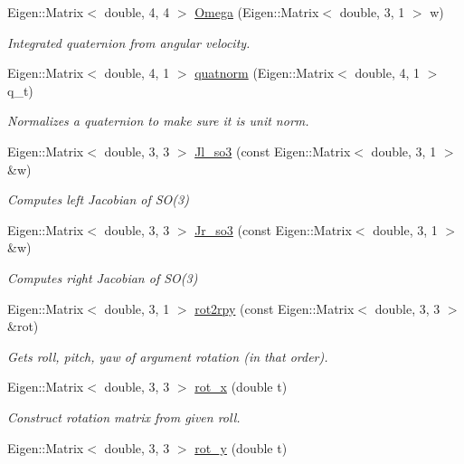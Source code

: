 \begin{DoxyCompactItemize}
Eigen\+::\+Matrix$<$ double, 4, 4 $>$ \hyperlink{namespaceov__core_a03115c09fd2fa8a6af23830b9230a683}{Omega} (Eigen\+::\+Matrix$<$ double, 3, 1 $>$ w)
\begin{DoxyCompactList}\small\item\em Integrated quaternion from angular velocity. \end{DoxyCompactList}\item 
Eigen\+::\+Matrix$<$ double, 4, 1 $>$ \hyperlink{namespaceov__core_a6c4586cceb6f81771921e61e135dcaed}{quatnorm} (Eigen\+::\+Matrix$<$ double, 4, 1 $>$ q\+\_\+t)
\begin{DoxyCompactList}\small\item\em Normalizes a quaternion to make sure it is unit norm. \end{DoxyCompactList}\item 
Eigen\+::\+Matrix$<$ double, 3, 3 $>$ \hyperlink{namespaceov__core_a518b7324a4106ccad60558e2e5c4b14f}{Jl\+\_\+so3} (const Eigen\+::\+Matrix$<$ double, 3, 1 $>$ \&w)
\begin{DoxyCompactList}\small\item\em Computes left Jacobian of S\+O(3) \end{DoxyCompactList}\item 
Eigen\+::\+Matrix$<$ double, 3, 3 $>$ \hyperlink{namespaceov__core_a0406d085d6175d3bc8a539328ec214b5}{Jr\+\_\+so3} (const Eigen\+::\+Matrix$<$ double, 3, 1 $>$ \&w)
\begin{DoxyCompactList}\small\item\em Computes right Jacobian of S\+O(3) \end{DoxyCompactList}\item 
Eigen\+::\+Matrix$<$ double, 3, 1 $>$ \hyperlink{namespaceov__core_af608ab8e3f8cd8554ade192cd804b7ce}{rot2rpy} (const Eigen\+::\+Matrix$<$ double, 3, 3 $>$ \&rot)
\begin{DoxyCompactList}\small\item\em Gets roll, pitch, yaw of argument rotation (in that order). \end{DoxyCompactList}\item 
Eigen\+::\+Matrix$<$ double, 3, 3 $>$ \hyperlink{namespaceov__core_ab3268e0844642c119fe45c2880afb581}{rot\+\_\+x} (double t)
\begin{DoxyCompactList}\small\item\em Construct rotation matrix from given roll. \end{DoxyCompactList}\item 
Eigen\+::\+Matrix$<$ double, 3, 3 $>$ \hyperlink{namespaceov__core_a2a212d931b6f4325052b3169ad6161a3}{rot\+\_\+y} (double t)

\end{DoxyCompactItemize}
